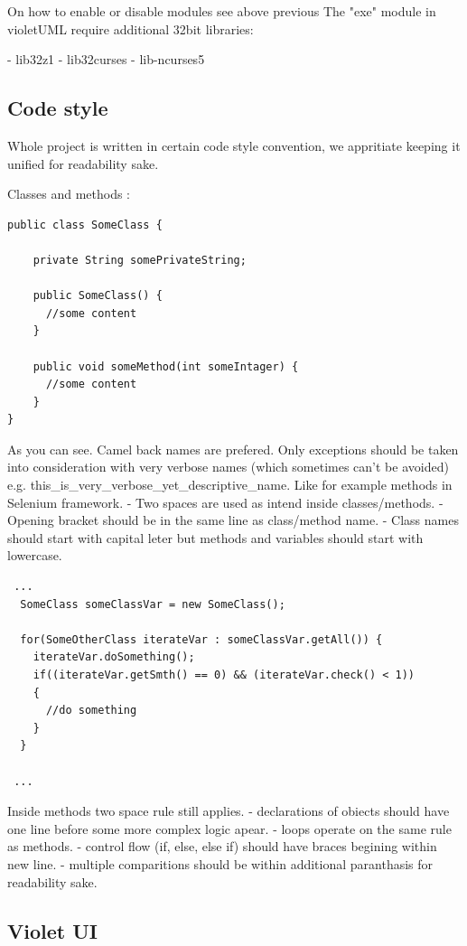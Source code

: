 \documentclass{article}
\begin{document}
On how to enable or disable modules see above previous
The "exe" module in violetUML require additional 32bit libraries:

- lib32z1
- lib32curses
- lib-ncurses5

\subsection{Code style}

Whole project is written in certain code style convention, we appritiate keeping it unified for readability sake.

Classes and methods :
\begin{lstlisting}
public class SomeClass {

    private String somePrivateString;

    public SomeClass() {
      //some content
    }

    public void someMethod(int someIntager) {
      //some content
    }
}
\end{lstlisting}

As you can see. Camel back names are prefered. Only exceptions should be taken into consideration with very verbose names (which sometimes
can't be avoided) e.g. this_is_very_verbose_yet_descriptive_name. Like for example methods in Selenium framework.
- Two spaces are used as intend inside classes/methods.
- Opening bracket should be in the same line as class/method name.
- Class names should start with capital leter but methods and variables should start with lowercase.

\begin{lstlisting}
 ...
  SomeClass someClassVar = new SomeClass();
  
  for(SomeOtherClass iterateVar : someClassVar.getAll()) {
    iterateVar.doSomething();
    if((iterateVar.getSmth() == 0) && (iterateVar.check() < 1))
    {
      //do something
    }
  }
  
 ...
\end{lstlisting}

Inside methods two space rule still applies.
- declarations of obiects should have one line before some more complex logic apear.
- loops operate on the same rule as methods.
- control flow (if, else, else if) should have braces begining within new line.
- multiple comparitions should be within additional paranthasis for readability sake.

\subsection{Violet UI}
\end{document}
